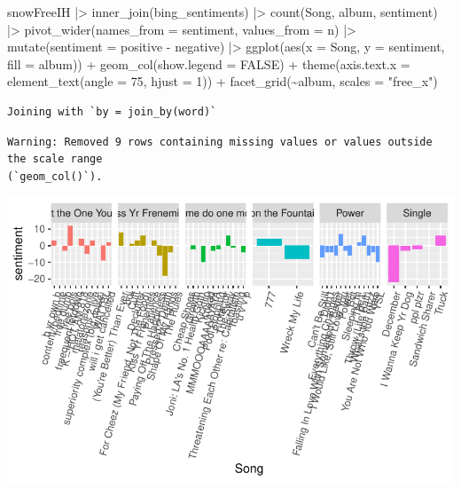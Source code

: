\documentclass[
  letterpaper,
  DIV=11,
  numbers=noendperiod]{scrartcl}
\newenvironment{Shaded}{\begin{snugshade}}{\end{snugshade}}
\newcommand{\AttributeTok}[1]{\textcolor[rgb]{0.40,0.45,0.13}{#1}}
\newcommand{\ConstantTok}[1]{\textcolor[rgb]{0.56,0.35,0.01}{#1}}
\newcommand{\DecValTok}[1]{\textcolor[rgb]{0.68,0.00,0.00}{#1}}
\newcommand{\FunctionTok}[1]{\textcolor[rgb]{0.28,0.35,0.67}{#1}}
\newcommand{\NormalTok}[1]{\textcolor[rgb]{0.00,0.23,0.31}{#1}}
\newcommand{\SpecialCharTok}[1]{\textcolor[rgb]{0.37,0.37,0.37}{#1}}
\newcommand{\StringTok}[1]{\textcolor[rgb]{0.13,0.47,0.30}{#1}}
\begin{document}
\begin{Shaded}
\begin{Highlighting}[]
\NormalTok{snowFreeIH }\SpecialCharTok{|\textgreater{}} 
  \FunctionTok{inner\_join}\NormalTok{(bing\_sentiments) }\SpecialCharTok{|\textgreater{}}
  \FunctionTok{count}\NormalTok{(Song, album, sentiment) }\SpecialCharTok{|\textgreater{}}
  \FunctionTok{pivot\_wider}\NormalTok{(}\AttributeTok{names\_from =}\NormalTok{ sentiment, }\AttributeTok{values\_from =}\NormalTok{ n) }\SpecialCharTok{|\textgreater{}}
  \FunctionTok{mutate}\NormalTok{(}\AttributeTok{sentiment =}\NormalTok{ positive }\SpecialCharTok{{-}}\NormalTok{ negative) }\SpecialCharTok{|\textgreater{}}
  \FunctionTok{ggplot}\NormalTok{(}\FunctionTok{aes}\NormalTok{(}\AttributeTok{x =}\NormalTok{ Song, }\AttributeTok{y =}\NormalTok{ sentiment, }\AttributeTok{fill =}\NormalTok{ album)) }\SpecialCharTok{+}
    \FunctionTok{geom\_col}\NormalTok{(}\AttributeTok{show.legend =} \ConstantTok{FALSE}\NormalTok{) }\SpecialCharTok{+}
  \FunctionTok{theme}\NormalTok{(}\AttributeTok{axis.text.x =} \FunctionTok{element\_text}\NormalTok{(}\AttributeTok{angle =} \DecValTok{75}\NormalTok{, }\AttributeTok{hjust =} \DecValTok{1}\NormalTok{)) }\SpecialCharTok{+}
  \FunctionTok{facet\_grid}\NormalTok{(}\SpecialCharTok{\textasciitilde{}}\NormalTok{album, }\AttributeTok{scales =} \StringTok{"free\_x"}\NormalTok{)}
\end{Highlighting}
\end{Shaded}

\begin{verbatim}
Joining with `by = join_by(word)`
\end{verbatim}

\begin{verbatim}
Warning: Removed 9 rows containing missing values or values outside the scale range
(`geom_col()`).
\end{verbatim}

\includegraphics{MP4_files/figure-pdf/unnamed-chunk-10-1.pdf}
\end{document}
